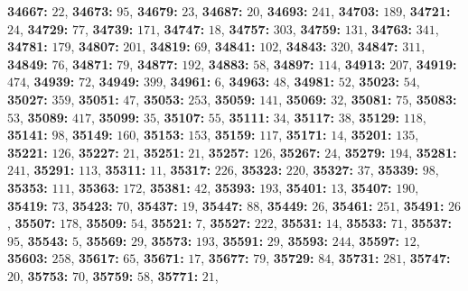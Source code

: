 \textsf{\bfseries 34667:} $22$, \textsf{\bfseries 34673:} $95$, \textsf{\bfseries 34679:} $23$, \textsf{\bfseries 34687:} $20$, \textsf{\bfseries 34693:} $241$, \textsf{\bfseries 34703:} $189$, \textsf{\bfseries 34721:} $24$, \textsf{\bfseries 34729:} $77$, \textsf{\bfseries 34739:} $171$, \textsf{\bfseries 34747:} $18$, \textsf{\bfseries 34757:} $303$, \textsf{\bfseries 34759:} $131$, \textsf{\bfseries 34763:} $341$, \textsf{\bfseries 34781:} $179$, \textsf{\bfseries 34807:} $201$, \textsf{\bfseries 34819:} $69$, \textsf{\bfseries 34841:} $102$, \textsf{\bfseries 34843:} $320$, \textsf{\bfseries 34847:} $311$, \textsf{\bfseries 34849:} $76$, \textsf{\bfseries 34871:} $79$, \textsf{\bfseries 34877:} $192$, \textsf{\bfseries 34883:} $58$, \textsf{\bfseries 34897:} $114$, \textsf{\bfseries 34913:} $207$, \textsf{\bfseries 34919:} $474$, \textsf{\bfseries 34939:} $72$, \textsf{\bfseries 34949:} $399$, \textsf{\bfseries 34961:} $6$, \textsf{\bfseries 34963:} $48$, \textsf{\bfseries 34981:} $52$, \textsf{\bfseries 35023:} $54$, \textsf{\bfseries 35027:} $359$, \textsf{\bfseries 35051:} $47$, \textsf{\bfseries 35053:} $253$, \textsf{\bfseries 35059:} $141$, \textsf{\bfseries 35069:} $32$, \textsf{\bfseries 35081:} $75$, \textsf{\bfseries 35083:} $53$, \textsf{\bfseries 35089:} $417$, \textsf{\bfseries 35099:} $35$, \textsf{\bfseries 35107:} $55$, \textsf{\bfseries 35111:} $34$, \textsf{\bfseries 35117:} $38$, \textsf{\bfseries 35129:} $118$, \textsf{\bfseries 35141:} $98$, \textsf{\bfseries 35149:} $160$, \textsf{\bfseries 35153:} $153$, \textsf{\bfseries 35159:} $117$, \textsf{\bfseries 35171:} $14$, \textsf{\bfseries 35201:} $135$, \textsf{\bfseries 35221:} $126$, \textsf{\bfseries 35227:} $21$, \textsf{\bfseries 35251:} $21$, \textsf{\bfseries 35257:} $126$, \textsf{\bfseries 35267:} $24$, \textsf{\bfseries 35279:} $194$, \textsf{\bfseries 35281:} $241$, \textsf{\bfseries 35291:} $113$, \textsf{\bfseries 35311:} $11$, \textsf{\bfseries 35317:} $226$, \textsf{\bfseries 35323:} $220$, \textsf{\bfseries 35327:} $37$, \textsf{\bfseries 35339:} $98$, \textsf{\bfseries 35353:} $111$, \textsf{\bfseries 35363:} $172$, \textsf{\bfseries 35381:} $42$, \textsf{\bfseries 35393:} $193$, \textsf{\bfseries 35401:} $13$, \textsf{\bfseries 35407:} $190$, \textsf{\bfseries 35419:} $73$, \textsf{\bfseries 35423:} $70$, \textsf{\bfseries 35437:} $19$, \textsf{\bfseries 35447:} $88$, \textsf{\bfseries 35449:} $26$, \textsf{\bfseries 35461:} $251$, \textsf{\bfseries 35491:} $26$, \textsf{\bfseries 35507:} $178$, \textsf{\bfseries 35509:} $54$, \textsf{\bfseries 35521:} $7$, \textsf{\bfseries 35527:} $222$, \textsf{\bfseries 35531:} $14$, \textsf{\bfseries 35533:} $71$, \textsf{\bfseries 35537:} $95$, \textsf{\bfseries 35543:} $5$, \textsf{\bfseries 35569:} $29$, \textsf{\bfseries 35573:} $193$, \textsf{\bfseries 35591:} $29$, \textsf{\bfseries 35593:} $244$, \textsf{\bfseries 35597:} $12$, \textsf{\bfseries 35603:} $258$, \textsf{\bfseries 35617:} $65$, \textsf{\bfseries 35671:} $17$, \textsf{\bfseries 35677:} $79$, \textsf{\bfseries 35729:} $84$, \textsf{\bfseries 35731:} $281$, \textsf{\bfseries 35747:} $20$, \textsf{\bfseries 35753:} $70$, \textsf{\bfseries 35759:} $58$, \textsf{\bfseries 35771:} $21$, 
